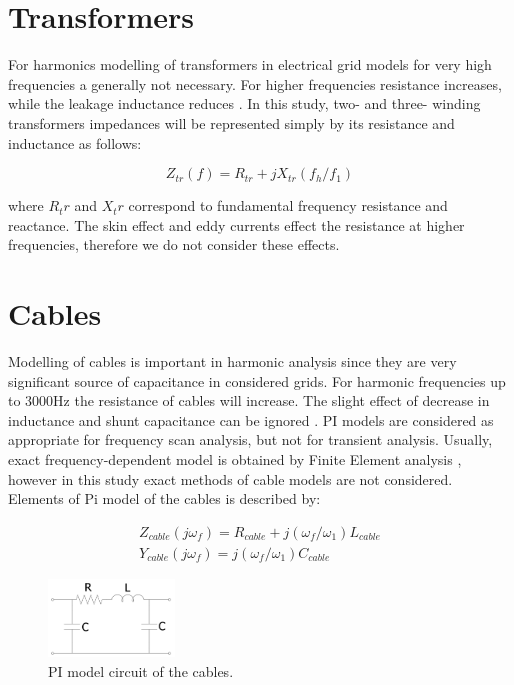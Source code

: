 \documentclass[12pt]{report} %
\begin{document}
\section{Transformers}
For harmonics modelling of transformers in electrical grid models for very high frequencies a generally not necessary. For higher frequencies resistance increases, while the leakage inductance reduces \cite{das}. In this study, two- and three- winding transformers impedances will be represented simply by its resistance and inductance as follows:

\begin{equation}
	Z_{tr}(f)=R_{tr}+jX_{tr} (f_h/f_1 )
\end{equation}

where $R_tr$ and $X_tr$ correspond to fundamental frequency resistance and reactance. The skin effect and eddy currents effect the resistance at higher frequencies, therefore we do not consider these effects.

\section{Cables}
Modelling of cables is important in harmonic analysis since they are very significant source of capacitance in considered grids. For harmonic frequencies up to 3000Hz the resistance of cables will increase. The slight effect of decrease in inductance and shunt capacitance can be ignored \cite{das}. PI models are considered as appropriate for frequency scan analysis, but not for transient analysis.
Usually, exact frequency-dependent model is obtained by Finite Element analysis \cite{das}, however in this study exact methods of cable models are not considered. Elements of Pi model of the cables is described by:

\begin{equation}
\begin{aligned}
	Z_{cable} (j\omega_f)=R_{cable}+j(\omega_f/\omega_1 ) L_{cable}
\\
	Y_{cable} (j\omega_f)=j(\omega_f/\omega_1 ) C_{cable}
\end{aligned}
\end{equation}

\begin{figure}[htb]
	\centering
    	\includegraphics[width=0.3\textwidth]{img/theory/pi_model.png}
  	\caption{PI model circuit of the cables.}
  	\label{fig:pimodel}
\end{figure}
\FloatBarrier
\end{document}

